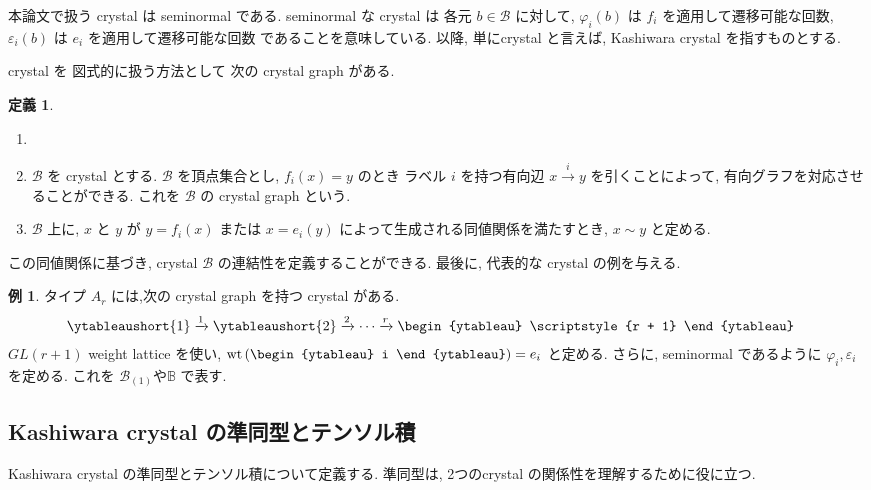 \documentclass[
  a4paper, 
  12pt,
  ja=standard,
  xelatex,
  left=30truemm,
  right=30truemm,
  titlepage 
]{bxjsarticle}
\theoremstyle{definition}
\newtheorem{df}{定義}[section]
\newtheorem*{ex}{例}
\begin{document}
本論文で扱う crystal は seminormal である.
seminormal な crystal は 各元 $b \in \mathcal{B}$ に対して,
$\varphi_i(b)$ は $f_i$ を適用して遷移可能な回数,
$\varepsilon_i(b)$ は $e_i$ を適用して遷移可能な回数 であることを意味している.
以降, 単にcrystal と言えば, Kashiwara crystal を指すものとする.

crystal を 図式的に扱う方法として 次の crystal graph がある.

\begin{df}
  \begin{enumerate}
    \item []
    \item $\mathcal{B}$ を crystal とする.  $\mathcal{B}$ を頂点集合とし,  $f_i(x) = y$ のとき
    ラベル $i$ を持つ有向辺 $ x \xrightarrow{i} y$ を引くことによって, 有向グラフを対応させることができる.
    これを $\mathcal{B}$ の crystal graph という.
    \item $\mathcal{B}$ 上に, $x$ と $y$ が $y = f_i(x)$ または $x = e_i(y)$ によって生成される同値関係を満たすとき,
    $x \sim y$ と定める.
  \end{enumerate}
\end{df}

この同値関係に基づき, crystal $\mathcal{B}$ の連結性を定義することができる.
最後に, 代表的な crystal の例を与える.

\begin{ex}
  タイプ $A_r$ には,次の crystal graph を持つ crystal がある.
  \[
  \begin{aligned}
      \ytableaushort{1}
      &\xrightarrow{1}
      \ytableaushort{2}
      \xrightarrow{2}
      \cdots
      \xrightarrow{r}
      \begin{ytableau}
        \scriptstyle{r + 1}
      \end{ytableau}
  \end{aligned}
  \]
  $GL(r + 1)$ weight lattice を使い, $\mathrm{wt} \left( \begin{ytableau} i \end{ytableau} \right) = e_i$ と定める.
  さらに, seminormal であるように $\varphi_i, \varepsilon_i$ を定める. これを $\mathcal{B}_{(1)}$や$\mathbb{B}$ で表す.
\end{ex}

\subsection{Kashiwara crystal の準同型とテンソル積}
Kashiwara crystal の準同型とテンソル積について定義する. 
準同型は, 2つのcrystal の関係性を理解するために役に立つ.
\end{document}
